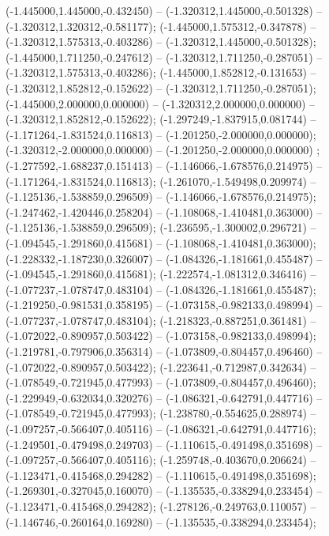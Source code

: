  (-1.445000,1.445000,-0.432450) -- (-1.320312,1.445000,-0.501328) -- (-1.320312,1.320312,-0.581177);
 (-1.445000,1.575312,-0.347878) -- (-1.320312,1.575313,-0.403286) -- (-1.320312,1.445000,-0.501328);
 (-1.445000,1.711250,-0.247612) -- (-1.320312,1.711250,-0.287051) -- (-1.320312,1.575313,-0.403286);
 (-1.445000,1.852812,-0.131653) -- (-1.320312,1.852812,-0.152622) -- (-1.320312,1.711250,-0.287051);
 (-1.445000,2.000000,0.000000) -- (-1.320312,2.000000,0.000000) -- (-1.320312,1.852812,-0.152622);
 (-1.297249,-1.837915,0.081744) -- (-1.171264,-1.831524,0.116813) -- (-1.201250,-2.000000,0.000000);
 (-1.320312,-2.000000,0.000000) -- (-1.201250,-2.000000,0.000000) ;
 (-1.277592,-1.688237,0.151413) -- (-1.146066,-1.678576,0.214975) -- (-1.171264,-1.831524,0.116813);
 (-1.261070,-1.549498,0.209974) -- (-1.125136,-1.538859,0.296509) -- (-1.146066,-1.678576,0.214975);
 (-1.247462,-1.420446,0.258204) -- (-1.108068,-1.410481,0.363000) -- (-1.125136,-1.538859,0.296509);
 (-1.236595,-1.300002,0.296721) -- (-1.094545,-1.291860,0.415681) -- (-1.108068,-1.410481,0.363000);
 (-1.228332,-1.187230,0.326007) -- (-1.084326,-1.181661,0.455487) -- (-1.094545,-1.291860,0.415681);
 (-1.222574,-1.081312,0.346416) -- (-1.077237,-1.078747,0.483104) -- (-1.084326,-1.181661,0.455487);
 (-1.219250,-0.981531,0.358195) -- (-1.073158,-0.982133,0.498994) -- (-1.077237,-1.078747,0.483104);
 (-1.218323,-0.887251,0.361481) -- (-1.072022,-0.890957,0.503422) -- (-1.073158,-0.982133,0.498994);
 (-1.219781,-0.797906,0.356314) -- (-1.073809,-0.804457,0.496460) -- (-1.072022,-0.890957,0.503422);
 (-1.223641,-0.712987,0.342634) -- (-1.078549,-0.721945,0.477993) -- (-1.073809,-0.804457,0.496460);
 (-1.229949,-0.632034,0.320276) -- (-1.086321,-0.642791,0.447716) -- (-1.078549,-0.721945,0.477993);
 (-1.238780,-0.554625,0.288974) -- (-1.097257,-0.566407,0.405116) -- (-1.086321,-0.642791,0.447716);
 (-1.249501,-0.479498,0.249703) -- (-1.110615,-0.491498,0.351698) -- (-1.097257,-0.566407,0.405116);
 (-1.259748,-0.403670,0.206624) -- (-1.123471,-0.415468,0.294282) -- (-1.110615,-0.491498,0.351698);
 (-1.269301,-0.327045,0.160070) -- (-1.135535,-0.338294,0.233454) -- (-1.123471,-0.415468,0.294282);
 (-1.278126,-0.249763,0.110057) -- (-1.146746,-0.260164,0.169280) -- (-1.135535,-0.338294,0.233454);

